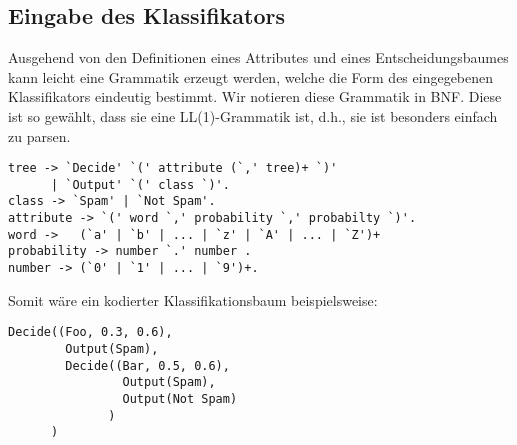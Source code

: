\documentclass{article}
\begin{document}
\subsection{Eingabe des Klassifikators}
Ausgehend von den Definitionen eines Attributes und eines Entscheidungsbaumes
kann leicht eine Grammatik erzeugt werden, welche die Form des eingegebenen
Klassifikators eindeutig bestimmt. Wir notieren diese Grammatik in BNF. Diese
ist so gew\"ahlt, dass sie eine LL(1)-Grammatik ist, d.h., sie ist besonders
einfach zu parsen.\\
\begin{verbatim}
tree -> `Decide' `(' attribute (`,' tree)+ `)'
      | `Output' `(' class `)'.
class -> `Spam' | `Not Spam'.
attribute -> `(' word `,' probability `,' probabilty `)'.
word ->   (`a' | `b' | ... | `z' | `A' | ... | `Z')+
probability -> number `.' number .
number -> (`0' | `1' | ... | `9')+.
\end{verbatim}

Somit w\"are ein kodierter Klassifikationsbaum beispielsweise:
\begin{verbatim}
Decide((Foo, 0.3, 0.6),
        Output(Spam), 
        Decide((Bar, 0.5, 0.6), 
                Output(Spam), 
                Output(Not Spam)
              )
      )
\end{verbatim}
\end{document}
